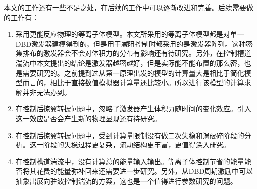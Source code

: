 本文的工作还有一些不足之处，在后续的工作中可以逐渐改进和完善。后续需要做的工作有：
\begin{enumerate}
  \item 采用更能反应物理的等离子体模型。本文所采用的等离子体模型都是对单一DBD激发器建模得到的，但是用于减阻控制时都采用的是激发器阵列。这种密集排布的激发器会不会对体积力的分布有影响还有待研究。另外，在控制槽道湍流中本文提出的结论是激发器越密越好，但是实际能不能布置的那么密，也是需要研究的。之前提到过从第一原理出发的模型的计算量大是相比于简化模型而言的，相比于直接数值模拟器计算量还比较小。所以进行该模型的计算求解并非无法办到。
  \item 在控制后掠翼转捩问题中，忽略了激发器产生体积力随时间的变化效应。引入这一效应是否会产生新的物理显现还有待研究。
  \item 在控制后掠翼转捩问题中，受到计算量限制没有做二次失稳和涡破碎阶段的分析。这一阶段的失稳过程更复杂，流动结构更丰富，更值得深入研究。
  \item 在控制槽道湍流中，没有计算总的能量输入输出。等离子体控制节省的能量能否将其花费的能量弥补回来还需要进一步研究。另外，从DBD周期激励中可以抽象出展向驻波控制湍流的方案，这也是一个值得进行参数研究的问题。
\end{enumerate}


